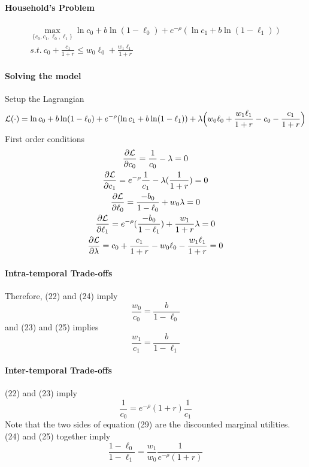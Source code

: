 \documentclass[11pt]{article}
\begin{document}
				\paragraph{Household's Problem}
					\begin{gather}
						\max_{\{c_0, c_1, \ell_0, \ell_1\}} \ln c_0 + b \ln (1-\ell_0) + e^{-\rho} (\ln c_1 + b \ln (1-\ell_1))\\
						s.t.\ c_0 + \frac{c_1}{1+r} \leq w_0 \ell_0 + \frac{w_1 \ell_1}{1+r}
					\end{gather}
				
				\paragraph{Solving the model} Setup the Lagrangian
					\begin{equation}
						\mathcal{{L}}(\cdot) = \ln c_0 + b \ln (1-\ell_0) + e^{-\rho} (\ln c_1 + b \ln (1-\ell_1)) + \lambda \Big(w_0 \ell_0 + \frac{w_1 \ell_1}{1+r} - c_0 - \frac{c_1}{1+r} \Big)
					\end{equation}
					First order conditions
					\begin{gather}
							\frac{\partial{\mathcal{{L}}}}{\partial{c_0}} = \frac{1}{c_0} - \lambda = 0 \\
							\frac{\partial{\mathcal{{L}}}}{\partial{c_1}} = e^{-\rho} \frac{1}{c_1} - \lambda (\frac{1}{1+r}) = 0 \\
							\frac{\partial{\mathcal{{L}}}}{\partial{\ell_0}} = \frac{-b_0}{1-\ell_0} + w_0 \lambda = 0 \\
							\frac{\partial{\mathcal{{L}}}}{\partial{\ell_1}} = e^{-\rho}(\frac{-b_0}{1-\ell_1}) + \frac{w_1}{1+r}\lambda = 0 \\
							\frac{\partial{\mathcal{{L}}}}{\partial{\lambda}} = c_0 + \frac{c_1}{1+r} - w_0 \ell_0 - \frac{w_1 \ell_1}{1+r} = 0
					\end{gather}
					\paragraph{Intra-temporal Trade-offs}
						Therefore, (22) and (24) imply
						\begin{equation}
							\frac{w_0}{c_0} = \frac{b}{1-\ell_0}
						\end{equation}
						and (23) and (25) implies
						\begin{equation}
							\frac{w_1}{c_1} = \frac{b}{1-\ell_1}
						\end{equation}
					\paragraph{Inter-temporal Trade-offs}
						(22) and (23) imply
						\begin{equation}
							\frac{1}{c_0} = e^{-\rho}(1+r)\frac{1}{c_1}
						\end{equation}
						Note that the two sides of equation (29) are the discounted marginal utilities.
						(24) and (25) together imply
						\begin{equation}
							\frac{1-\ell_0}{1-\ell_1} = \frac{w_1}{w_0}\frac{1}{e^{-\rho}(1+r)}
						\end{equation}
\end{document}
